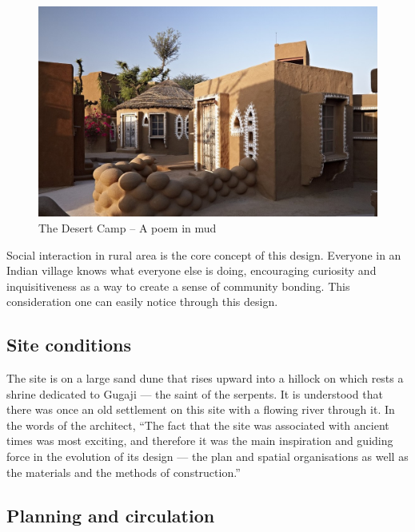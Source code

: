 \begin{figure}[H]
  \centering
  \includegraphics[angle=0,width=1.0\textwidth]{img/dc-01}
  \caption{The Desert Camp -- A poem in mud}
  \label{fig:dc-01} 
\end{figure}

\noindent Social interaction in rural area is the core concept of this design. Everyone in an Indian village knows what everyone else is doing, encouraging curiosity and inquisitiveness as a way to create a sense of community bonding. This consideration one can easily notice through this design.


\subsection{Site conditions} %
\label{sub:dcm_sitecond}

The site is on a large sand dune that rises upward into a hillock on which rests a shrine dedicated to Gugaji --- the saint of the serpents. It is understood that there was once an old settlement on this site with a flowing river through it. In the words of the architect, ``The fact that the site was associated with ancient times was most exciting, and therefore it was the main inspiration and guiding force in the evolution of its design --- the plan and spatial organisations as well as the materials and the methods of construction.''


\subsection{Planning and circulation} %
\label{sub:dcm_planning}

